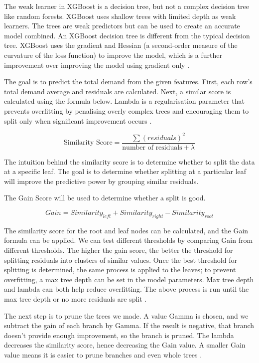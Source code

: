 \documentclass[mstat,12pt]{unswthesis}
\begin{document}
The weak learner in XGBoost is a decision tree, but not a complex
decision tree like random forests. XGBoost uses shallow trees with
limited depth as weak learners. The trees are weak predictors but can be
used to create an accurate model combined. An XGBoost decision tree is
different from the typical decision tree. XGBoost uses the gradient and
Hessian (a second-order measure of the curvature of the loss function)
to improve the model, which is a further improvement over improving the
model using gradient only \cite{chen_2016_xgboost}.

The goal is to predict the total demand from the given features. First,
each row's total demand average and residuals are calculated. Next, a
similar score is calculated using the formula below. Lambda is a
regularisation parameter that prevents overfitting by penalising overly
complex trees and encouraging them to split only when significant
improvement occurs \cite{chen_2016_xgboost}.

\[
\text{Similarity Score} = \frac{\sum{(residuals)}^2 }{\text{number of residuals} + \lambda}
\]

The intuition behind the similarity score is to determine whether to
split the data at a specific leaf. The goal is to determine whether
splitting at a particular leaf will improve the predictive power by
grouping similar residuals.

The Gain Score will be used to determine whether a split is good.

\[
Gain = {Similarity}_{left} + {Similarity}_{right} - {Similarity}_{root}
\]

The similarity score for the root and leaf nodes can be calculated, and
the Gain formula can be applied. We can test different thresholds by
comparing Gain from different thresholds. The higher the gain score, the
better the threshold for splitting residuals into clusters of similar
values. Once the best threshold for splitting is determined, the same
process is applied to the leaves; to prevent overfitting, a max tree
depth can be set in the model parameters. Max tree depth and lambda can
both help reduce overfitting. The above process is run until the max
tree depth or no more residuals are split \cite{a2016_how}.

The next step is to prune the trees we made. A value Gamma is chosen,
and we subtract the gain of each branch by Gamma. If the result is
negative, that branch doesn't provide enough improvement, so the branch
is pruned. The lambda decreases the similarity score, hence decreasing
the Gain value. A smaller Gain value means it is easier to prune
branches and even whole trees \cite{a2016_how}.
\end{document}
